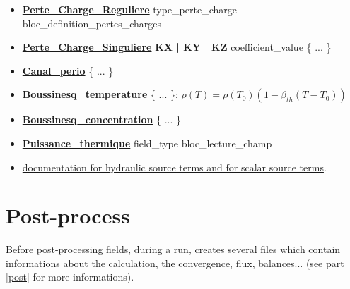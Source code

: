 \begin{itemize}
\item \href{\REFERENCEMANUAL\#pertechargereguliere}{\textbf{Perte\_Charge\_Reguliere}} type\_perte\_charge bloc\_definition\_pertes\_charges
\item \href{\REFERENCEMANUAL\#pertechargesinguliere}{\textbf{Perte\_Charge\_Singuliere}} \textbf{KX | KY | KZ} coefficient\_value \{ ... \} 
\item \href{\REFERENCEMANUAL\#canalperio}{\textbf{Canal\_perio}} \{ ... \} 
\item \href{\REFERENCEMANUAL\#boussinesqtemperature}{\textbf{Boussinesq\_temperature}} \{ ... \}: $\rho(T)=\rho(T_0)(1-\beta_{th}(T-T_0))$
\item \href{\REFERENCEMANUAL\#boussinesqconcentration}{\textbf{Boussinesq\_concentration}} \{ ... \}
\item \href{\REFERENCEMANUAL\#puissancethermique}{\textbf{Puissance\_thermique}} field\_type   bloc\_lecture\_champ 
\item \href{\REFERENCEMANUAL\#sourcebase}{documentation for hydraulic source terms and for scalar source terms}.
\end{itemize}





\section{Post-process}

Before post-processing fields, during a run, \trust creates several files which contain informations about the calculation, the convergence, flux, balances... (see part \ref{post} for more informations).\\

